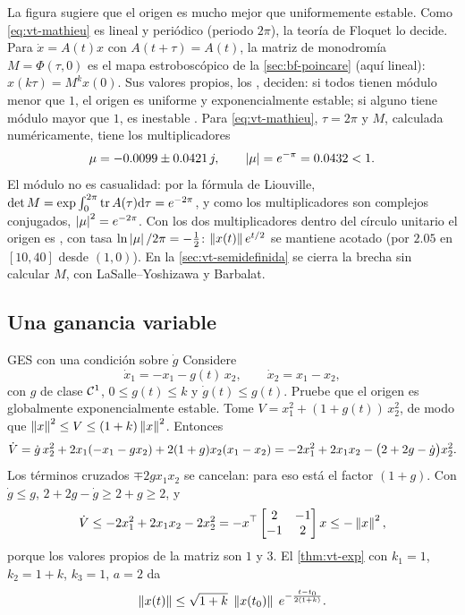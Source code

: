 La figura sugiere que el origen es mucho mejor que uniformemente estable. Como \eqref{eq:vt-mathieu} es lineal y periódico (periodo $2\pi$), la teoría de Floquet lo decide. Para $\dot x=A(t)x$ con $A(t+\tau)=A(t)$, la matriz de monodromía $M=\Phi(\tau,0)$ es el mapa estroboscópico de la \cref{sec:bf-poincare} (aquí lineal): $x(k\tau)=M^kx(0)$. Sus valores propios, los , deciden: si todos tienen módulo menor que $1$, el origen es uniforme y exponencialmente estable; si alguno tiene módulo mayor que $1$, es inestable \citep[\S7.3, Prop.~7.14]{Sas99}. Para \eqref{eq:vt-mathieu}, $\tau=2\pi$ y $M$, calculada numéricamente, tiene los multiplicadores
\[
  \mu=-0.0099\pm0.0421\,j,\qquad\left\lvert \mu\right\rvert=e^{-\pi}=0.0432<1 .
\]
El módulo no es casualidad: por la fórmula de Liouville, $\det M=\exp\int_0^{2\pi}\operatorname{tr}A(\tau)\mathrm{d}\tau=e^{-2\pi}$, y como los multiplicadores son complejos conjugados, $\left\lvert \mu\right\rvert^2=e^{-2\pi}$. Con los dos multiplicadores dentro del círculo unitario el origen es , con tasa $\ln\left\lvert \mu\right\rvert/2\pi=-\tfrac12$: $\left\lVert x(t)\right\rVert e^{t/2}$ se mantiene acotado (por $2.05$ en $[10,40]$ desde $(1,0)$). En la \cref{sec:vt-semidefinida} se cierra la brecha sin calcular $M$, con LaSalle--Yoshizawa y Barbalat.



\subsection{Una ganancia variable}

\begin{ejemplo}[label=ej:vt-ganancia]{GES con una condición sobre $\dot g$ \citep[\S4.5]{Kha02}}
Considere
\[
  \dot x_1=-x_1-g(t)\,x_2,\qquad\dot x_2=x_1-x_2 ,
\]
con $g$ de clase $\mathcal{C}^{1}$, $0\le g(t)\le k$ y $\dot g(t)\le g(t)$. Pruebe que el origen es globalmente exponencialmente estable.
\solucion Tome $V=x_1^2+(1+g(t))\,x_2^2$, de modo que $\left\lVert x\right\rVert^2\le V\le(1+k)\left\lVert x\right\rVert^2$. Entonces
\[
  \dot V=\dot g\,x_2^2+2x_1(-x_1-gx_2)+2(1+g)x_2(x_1-x_2)=-2x_1^2+2x_1x_2-\bigl(2+2g-\dot g\bigr)x_2^2 .
\]
Los términos cruzados $\mp2gx_1x_2$ se cancelan: para eso está el factor $(1+g)$. Con $\dot g\le g$, $2+2g-\dot g\ge2+g\ge2$, y
\[
  \dot V\le-2x_1^2+2x_1x_2-2x_2^2=-x^{\top}\begin{bmatrix}2&-1\\-1&2\end{bmatrix}x\le-\left\lVert x\right\rVert^2 ,
\]
porque los valores propios de la matriz son $1$ y $3$. El \cref{thm:vt-exp} con $k_1=1$, $k_2=1+k$, $k_3=1$, $a=2$ da
\[
  \left\lVert x(t)\right\rVert\le\sqrt{1+k}\;\left\lVert x(t_0)\right\rVert\;e^{-\frac{t-t_0}{2(1+k)}} .
\]
\end{ejemplo}

